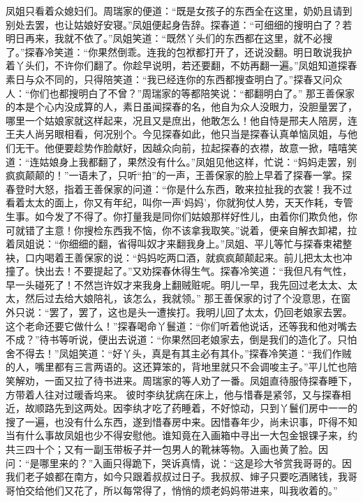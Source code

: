 \documentclass[12pt,oneside]{book}
\begin{document}
凤姐只看着众媳妇们。周瑞家的便道：“既是女孩子的东西全在这里，奶奶且请到别处去罢，也让姑娘好安寝。”凤姐便起身告辞。探春道：“可细细的搜明白了？若明日再来，我就不依了。”凤姐笑道：“既然丫头们的东西都在这里，就不必搜了。”探春冷笑道：“你果然倒乖。连我的包袱都打开了，还说没翻。明日敢说我护着丫头们，不许你们翻了。你趁早说明，若还要翻，不妨再翻一遍。”凤姐知道探春素日与众不同的，只得陪笑道：“我已经连你的东西都搜查明白了。”探春又问众人：“你们也都搜明白了不曾？”周瑞家的等都陪笑说：“都翻明白了。”
那王善保家的本是个心内没成算的人，素日虽闻探春的名，他自为众人没眼力，没胆量罢了，哪里一个姑娘家就这样起来，况且又是庶出，他敢怎么！他自恃是邢夫人陪房，连王夫人尚另眼相看，何况别个。今见探春如此，他只当是探春认真单恼凤姐，与他们无干。他便要趁势作脸献好，因越众向前，拉起探春的衣襟，故意一掀，嘻嘻笑道：“连姑娘身上我都翻了，果然没有什么。”凤姐见他这样，忙说：“妈妈走罢，别疯疯颠颠的！”一语未了，只听“拍”的一声，王善保家的脸上早着了探春一掌。探春登时大怒，指着王善保家的问道：“你是什么东西，敢来拉扯我的衣裳！我不过看着太太的面上，你又有年纪，叫你一声‘妈妈’，你就狗仗人势，天天作耗，专管生事。如今发了不得了。你打量我是同你们姑娘那样好性儿，由着你们欺负他，你可就错了主意！你搜检东西我不恼，你不该拿我取笑。”说着，便亲自解衣卸裙，拉着凤姐说：“你细细的翻，省得叫奴才来翻我身上。”凤姐、平儿等忙与探春束裙整袂，口内喝着王善保家的说：“妈妈吃两口酒，就疯疯颠颠起来。前儿把太太也冲撞了。快出去！不要提起了。”又劝探春休得生气。探春冷笑道：“我但凡有气性，早一头碰死了！不然岂许奴才来我身上翻贼赃呢。明儿一早，我先回过老太太、太太，然后过去给大娘陪礼，该怎么，我就领。”
那王善保家的讨了个没意思，在窗外只说：“罢了，罢了，这也是头一遭挨打。我明儿回了太太，仍回老娘家去罢。这个老命还要它做什么！”探春喝命丫鬟道：“你们听着他说话，还等我和他对嘴去不成？”待书等听说，便出去说道：“你果然回老娘家去，倒是我们的造化了。只怕舍不得去！”凤姐笑道：“好丫头，真是有其主必有其仆。”探春冷笑道：“我们作贼的人，嘴里都有三言两语的。这还算笨的，背地里就只不会调唆主子。”平儿忙也陪笑解劝，一面又拉了待书进来。周瑞家的等人劝了一番。凤姐直待服侍探春睡下，方带着人往对过暖香坞来。
彼时李纨犹病在床上，他与惜春是紧邻，又与探春相近，故顺路先到这两处。因李纨才吃了药睡着，不好惊动，只到丫鬟们房中一一的搜了一遍，也没有什么东西，遂到惜春房中来。因惜春年少，尚未识事，吓得不知当有什么事故凤姐也少不得安慰他。谁知竟在入画箱中寻出一大包金银锞子来，约共三四十个；又有一副玉带板子并一包男人的靴袜等物。入画也黄了脸。因问：“是哪里来的？”入画只得跪下，哭诉真情，说：“这是珍大爷赏我哥哥的。因我们老子娘都在南方，如今只跟着叔叔过日子。我叔叔、婶子只要吃酒赌钱，我哥哥怕交给他们又花了，所以每常得了，悄悄的烦老妈妈带进来，叫我收着的。”
\end{document}
